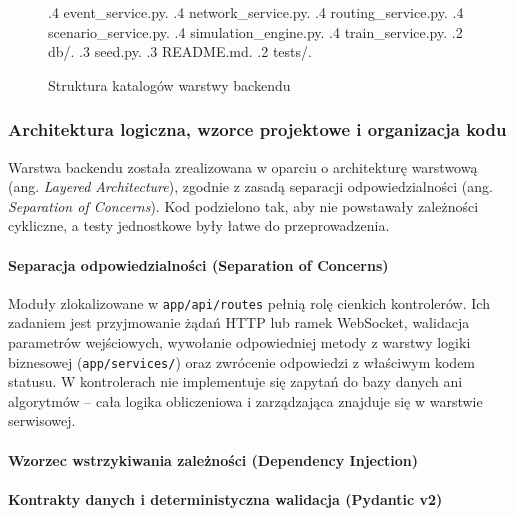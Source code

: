 \documentclass[twoside]{projektInzynierskiMS1z}
\begin{document}
\begin{figure}[htbp]
\begin{minipage}{\textwidth}
{.4 event\_service.py.
.4 network\_service.py.
.4 routing\_service.py.
.4 scenario\_service.py.
.4 simulation\_engine.py.
.4 train\_service.py.
.2 db/.
.3 seed.py.
.3 README.md.
.2 tests/.
}
\end{minipage}
\caption{Struktura katalogów warstwy backendu}
\label{fig:backend_tree}
\end{figure}

\subsubsection{Architektura logiczna, wzorce projektowe i organizacja kodu}
Warstwa backendu została zrealizowana w oparciu o architekturę warstwową
(ang. \emph{Layered Architecture}), zgodnie z zasadą separacji odpowiedzialności
(ang. \emph{Separation of Concerns}). Kod podzielono tak, aby nie powstawały
zależności cykliczne, a testy jednostkowe były łatwe do przeprowadzenia.

    \paragraph{Separacja odpowiedzialności (Separation of Concerns)}
    Moduły zlokalizowane w \texttt{app/api/routes} pełnią rolę cienkich
    kontrolerów. Ich zadaniem jest przyjmowanie żądań HTTP lub ramek WebSocket,
    walidacja parametrów wejściowych, wywołanie odpowiedniej metody z warstwy
    logiki biznesowej (\texttt{app/services/}) oraz zwrócenie odpowiedzi
    z właściwym kodem statusu. W kontrolerach nie implementuje się zapytań do
    bazy danych ani algorytmów -- cała logika obliczeniowa i zarządzająca
    znajduje się w warstwie serwisowej.
    \paragraph{Wzorzec wstrzykiwania zależności (Dependency Injection)}
    \paragraph{Kontrakty danych i deterministyczna walidacja (Pydantic v2)}
\end{document}
